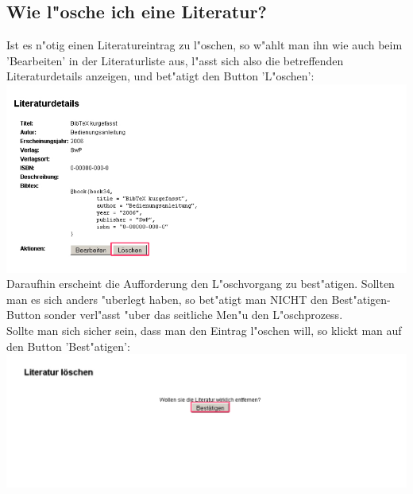 \subsection{Wie l"osche ich eine Literatur?}
Ist es n"otig einen Literatureintrag zu l"oschen, so w"ahlt man ihn wie auch beim 'Bearbeiten' in der Literaturliste aus, l"asst sich also die betreffenden Literaturdetails anzeigen, und bet"atigt den Button 'L"oschen':\\
\includegraphics[scale=0.8]{del_lit}\\
Daraufhin erscheint die Aufforderung den L"oschvorgang zu best"atigen. Sollten man es sich anders "uberlegt haben, so bet"atigt man NICHT den Best"atigen-Button sonder verl"asst "uber das seitliche Men"u den L"oschprozess.\\
Sollte man sich sicher sein, dass man den Eintrag l"oschen will, so klickt man auf den Button 'Best"atigen':\\
\includegraphics[scale=0.8]{sure}\\


